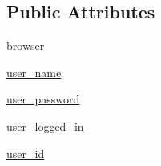 \subsection*{Public Attributes}
\begin{DoxyCompactItemize}
\item 
\hyperlink{classpygce_1_1models_1_1bot_1_1_garmin_connect_bot_a60f14c87e68f9067680ba264205a0f5c}{browser}
\item 
\hyperlink{classpygce_1_1models_1_1bot_1_1_garmin_connect_bot_a259da08c172fe9b54bbb6b997ab840a7}{user\+\_\+name}
\item 
\hyperlink{classpygce_1_1models_1_1bot_1_1_garmin_connect_bot_af3d5c76d7e90a6aefe67926755d08c01}{user\+\_\+password}
\item 
\hyperlink{classpygce_1_1models_1_1bot_1_1_garmin_connect_bot_ae6d646cac47d9930a50be37aad133dea}{user\+\_\+logged\+\_\+in}
\item 
\hyperlink{classpygce_1_1models_1_1bot_1_1_garmin_connect_bot_a762d018855af5616f0519e08c354a7c7}{user\+\_\+id}
\end{DoxyCompactItemize}
